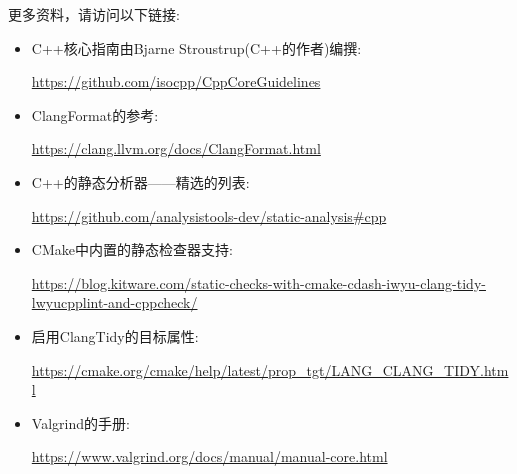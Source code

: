 更多资料，请访问以下链接:

\begin{itemize}
\item 
C++核心指南由Bjarne Stroustrup(C++的作者)编撰:

\url{https://github.com/isocpp/CppCoreGuidelines}

\item 
ClangFormat的参考:

\url{https://clang.llvm.org/docs/ClangFormat.html}

\item 
C++的静态分析器——精选的列表: 

\url{https://github.com/analysistools-dev/static-analysis\#cpp}

\item 
CMake中内置的静态检查器支持:

\url{https://blog.kitware.com/static-checks-with-cmake-cdash-iwyu-clang-tidy-lwyucpplint-and-cppcheck/}

\item 
启用ClangTidy的目标属性:

\url{https://cmake.org/cmake/help/latest/prop\_tgt/LANG\_CLANG\_TIDY.html}

\item 
Valgrind的手册:

\url{https://www.valgrind.org/docs/manual/manual-core.html}
\end{itemize}
